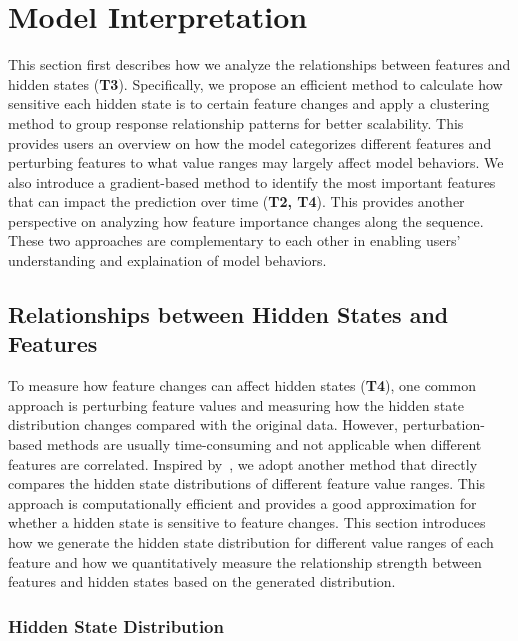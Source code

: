 \section{Model Interpretation}
This section first describes how we analyze the relationships between features and hidden states (\textbf{T3}).
Specifically, we propose an efficient method to calculate how sensitive each hidden state is to certain feature changes and apply a clustering method to group response relationship patterns for better scalability.
This provides users an overview on how the model categorizes different features and perturbing features to what value ranges may largely affect model behaviors.
We also introduce a gradient-based method to identify the most important features that can impact the prediction over time (\textbf{T2, T4}).
This provides another perspective on analyzing how feature importance changes along the sequence.
These two approaches are complementary to each other in enabling users'  understanding and explaination of model behaviors.

\subsection{Relationships between Hidden States and Features}

To measure how feature changes can affect hidden states (\textbf{T4}), one common approach is perturbing feature values and measuring how the hidden state distribution changes compared with the original data.
However, perturbation-based methods are usually time-consuming and not applicable when different features are correlated.
Inspired by~\cite{sun2015deeply}, we adopt another method that directly compares the hidden state distributions of different feature value ranges.
This approach is computationally efficient and provides a good approximation for whether a hidden state is sensitive to feature changes.
This section introduces how we generate the hidden state distribution for different value ranges of each feature and how we quantitatively measure the relationship strength between features and hidden states based on the generated distribution.

\subsubsection{Hidden State Distribution}
\label{section:response_and_activation}

